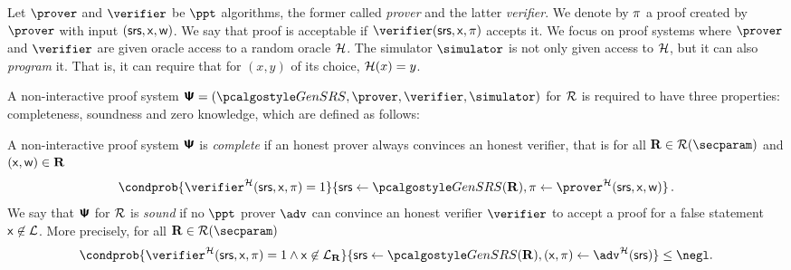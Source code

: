 Let $\prover$ and $\verifier$ be $\ppt$ algorithms, the former called \emph{prover}
and the latter \emph{verifier}. 
We denote by $\pi$ a proof created by $\prover$ with input
$(\mathsf{srs}, \mathsf{x}, \mathsf{w})$. We say that proof is acceptable if $\verifier (\srs, \inp,
\zkproof)$ accepts it. We focus on proof systems where $\prover$ and
$\verifier$ are given oracle access to a random oracle $\mathcal{H}$. The simulator
$\simulator$ is not only given access to $\mathcal{H}$, but it can also \emph{program}
it. That is, it can require that for $(x, y)$ of its choice, $\mathcal{H} (x) = y$.

A non-interactive  proof system $\proofsystem = (\kgen, \prover, \verifier, \simulator)$ for $\mathcal{R}$ is
required to have three properties: completeness, soundness and zero knowledge, which are
defined as follows:


  A non-interactive proof system $\bm{\mathsf{\Psi}}$ is
  \emph{complete} if an honest prover always convinces an honest verifier, that
  is for all $\REL \in \RELGEN(\secparam)$ and $(\mathsf{x}, \mathsf{w}) \in \mathbf{R}$
	\[
		\condprob{\verifier^\ro (\srs, \inp, \zkproof) = 1} {\srs \gets \kgen(\REL),
      \zkproof \gets \prover^\ro (\srs, \inp, \wit)}\,.
	\]
    We say that $\bm{\mathsf{\Psi}}$ for $\mathcal{R}$ is \emph{sound} if no
  $\ppt$ prover $\adv$ can convince an honest verifier $\verifier$ to accept a
  proof for a false statement $\mathsf{x} \not\in\mathcal{L}$. More precisely, for
  all $\REL \in \RELGEN(\secparam)$
	\[
    \condprob{ \verifier^\ro (\srs, \inp, \zkproof) = 1 \land \inp \not\in
      \LANG_\REL}{\srs \gets \kgen(\REL), (\inp, \zkproof) \gets \adv^\ro(\srs)} \leq
    \negl.
	\]
\fi


